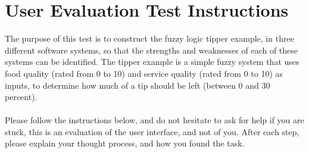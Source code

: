 \section{User Evaluation Test Instructions}
\label{app-userEval}
The purpose of this test is to construct the fuzzy logic tipper example, in three different software systems, so that the strengths and weaknesses of each of these systems can be identified. The tipper example is a simple fuzzy system that uses food quality (rated from 0 to 10) and service quality (rated from 0 to 10) as inputs, to determine how much of a tip should be left (between 0 and 30 percent). \ \\
\ \\
Please follow the instructions below, and do not hesitate to ask for help if you are stuck, this is an evaluation of the user interface, and not of you. After each step, please explain your thought process, and how you found the task.

